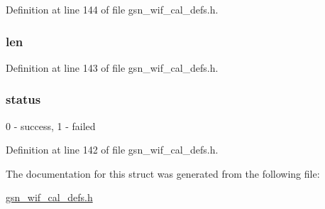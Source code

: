 Definition at line 144 of file gsn\_\-wif\_\-cal\_\-defs.h.

\hypertarget{a00320_a197a42ec85f4898bd19c17b05bc07d81}{
\subsubsection[{len}]{ {\bf len}}}
\label{a00320_a197a42ec85f4898bd19c17b05bc07d81}


Definition at line 143 of file gsn\_\-wif\_\-cal\_\-defs.h.

\hypertarget{a00320_ac4f6d5d1544a8d2c1309479ffe1b61ab}{
\subsubsection[{status}]{ {\bf status}}}
\label{a00320_ac4f6d5d1544a8d2c1309479ffe1b61ab}
0 -\/ success, 1 -\/ failed 

Definition at line 142 of file gsn\_\-wif\_\-cal\_\-defs.h.



The documentation for this struct was generated from the following file:\begin{DoxyCompactItemize}
\item 
\hyperlink{a00607}{gsn\_\-wif\_\-cal\_\-defs.h}\end{DoxyCompactItemize}
